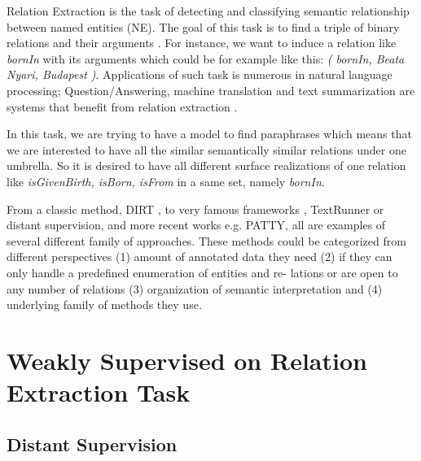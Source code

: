 \documentclass[12pt]{report}
\begin{document}
Relation Extraction is the task of detecting and classifying semantic relationship 
between named entities (NE). The goal of this task is to find a triple
of binary relations and their arguments \cite{Androutsopoulos2009}. For instance, we want to induce a
relation like \emph{bornIn} with its arguments which could be for example like this:\emph{ (
bornIn, Beata Nyari, Budapest )}. Applications of such task is numerous
in natural language processing; Question/Answering, machine translation and
text summarization are systems that benefit from relation extraction \cite{Androutsopoulos2009}.

In this task, we are trying to have a model to find paraphrases which means
that we are interested to have all the similar semantically similar relations under
one umbrella. So it is desired to have all different surface realizations of one
relation like \emph{isGivenBirth, isBorn, isFrom} in a same set, namely \emph{bornIn}.

From a classic method, DIRT \cite{Lin2001}, to very famous frameworks ,
TextRunner\cite{Bankoa} or distant supervision\cite{Mintz2009}, and more recent works e.g. PATTY\cite{Nakashole2012a},
all are examples of several different family of approaches. These methods could
be categorized from different perspectives (1) amount of annotated data they
need (2) if they can only handle a predefined enumeration of entities and re-
lations or are open to any number of relations (3) organization of semantic
interpretation and (4) underlying family of methods they use.

\chapter{Weakly Supervised on Relation Extraction Task}
\label{ch:weakly-supervised}

\section{Distant Supervision}
\label{sec:dist-supervision}
\end{document}
